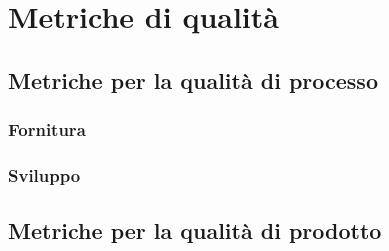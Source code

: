 \section{Metriche di qualità}


\subsection{Metriche per la qualità di processo}

\subsubsection{Fornitura}

\subsubsection{Sviluppo}

\subsection{Metriche per la qualità di prodotto}